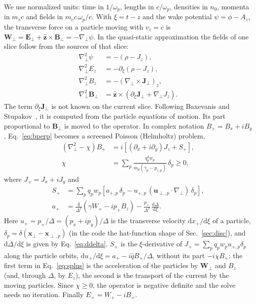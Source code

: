 \documentclass[aps,prab,reprint,floatfix,superscriptaddress,amsmath,amssymb]{revtex4-2}
\newcommand{\dd}{\mathrm{d}}
\begin{document}
We use normalized units: time in $1/\omega_p$, lengths in $c/\omega_p$, densities in $n_0$, momenta in $m_s c$ and fields in $m_e c\,\omega_p/e$. With $\xi = t - z$ and the wake potential $\psi = \phi - A_z$, the transverse force on a particle moving with $v_z = c$ is $\bm{W}_\perp = \bm{E}_\perp + \hat{\bm z}\times\bm{B}_\perp = -\nabla_\perp\psi$. In the quasi-static approximation the fields of one slice follow from the sources of that slice:
\begin{align}
\nabla_\perp^2 \psi &= -(\rho - J_z), \label{eq:psi}\\
\nabla_\perp^2 E_z &= -\partial_\xi(\rho - J_z), \label{eq:ez}\\
\nabla_\perp^2 B_z &= -(\nabla_\perp\times\bm{J}_\perp)_z, \label{eq:bz}\\
\nabla_\perp^2 \bm{B}_\perp &= \hat{\bm z}\times\left(\partial_\xi \bm{J}_\perp + \nabla_\perp J_z\right). \label{eq:bperp}
\end{align}
The term $\partial_\xi\bm{J}_\perp$ is not known on the current slice. Following Baxevanis and Stupakov~\cite{Baxevanis2018}, it is computed from the particle equations of motion. Its part proportional to $\bm{B}_\perp$ is moved to the operator. In complex notation $B_+ = B_x + iB_y$, Eq.~\eqref{eq:bperp} becomes a screened Poisson (Helmholtz) problem,
\begin{align}
\left(\nabla_\perp^2 - \chi\right) B_+ &= i\left[(\partial_x + i\partial_y) J_z + S_+\right], \label{eq:helm}\\
\chi &= \sum_p \frac{q_p^2 w_p}{m_p(\gamma_p - p_{z,p})}\,\delta_p \ge 0, \label{eq:chi}
\end{align}
where $J_+ = J_x + iJ_y$ and
\begin{align}
S_+ &= \sum_p q_p w_p \left[ a_{+,p}\, \delta_p - u_{+,p}\, (\bm{u}_{\perp,p}\cdot\nabla_\perp)\, \delta_p \right], \label{eq:splus}\\
a_+ &= \frac{\hat q}{\Delta^2}\left(\gamma W_+ - i p_+ B_z\right) - \frac{p_+}{\Delta^2}\,\frac{\dd\Delta}{\dd\xi}. \label{eq:aplus}
\end{align}
Here $u_+ = p_+/\Delta = (p_x + i p_y)/\Delta$ is the transverse velocity $\dd x_+/\dd\xi$ of a particle, $\delta_p = \delta(\bm{x}_\perp - \bm{x}_{\perp,p})$ (in the code the hat-function shape of Sec.~\ref{sec:disc}), and $\dd\Delta/\dd\xi$ is given by Eq.~\eqref{eq:ddelta}. $S_+$ is the $\xi$-derivative of $J_+ = \sum_p q_p w_p u_{+,p}\delta_p$ along the particle orbits, $\dd u_+/\dd\xi = a_+ - i\hat q B_+/\Delta$, without its part $-i\chi B_+$: the first term in Eq.~\eqref{eq:splus} is the acceleration of the particles by $\bm{W}_\perp$ and $B_z$ (and, through $\Delta$, by $E_z$), the second is the transport of the current by the moving particles. Since $\chi\ge 0$, the operator is negative definite and the solve needs no iteration. Finally $E_+ = W_+ - iB_+$.
\end{document}
